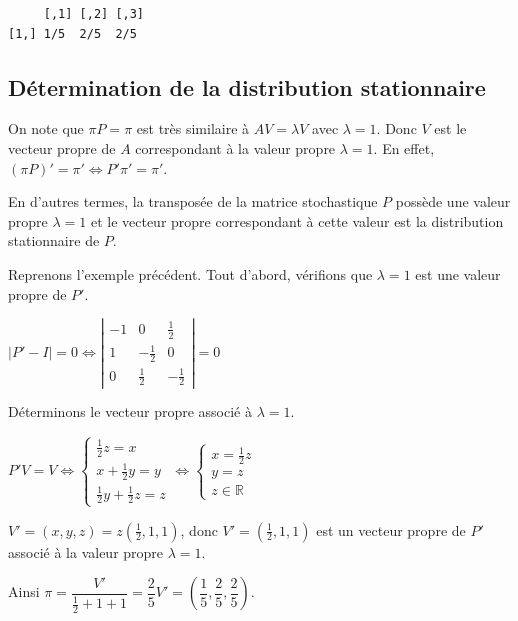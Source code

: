 \documentclass[
]{book}
\theoremstyle{definition}
\theoremstyle{definition}
\theoremstyle{definition}
\theoremstyle{remark}
\begin{document}
\begin{verbatim}
     [,1] [,2] [,3]
[1,] 1/5  2/5  2/5 
\end{verbatim}

\hypertarget{duxe9termination-de-la-distribution-stationnaire}{%
\subsection{Détermination de la distribution stationnaire}\label{duxe9termination-de-la-distribution-stationnaire}}

On note que \(\pi P=\pi\) est très similaire à \(AV=\lambda V\) avec \(\lambda=1\). Donc \(V\) est le vecteur propre de \(A\) correspondant à la valeur propre \(\lambda=1\). En effet, \(\left(\pi P\right)'=\pi' \Longleftrightarrow P'\pi'=\pi'\).

En d'autres termes, la transposée de la matrice stochastique \(P\) possède une valeur propre \(\lambda=1\) et le vecteur propre correspondant à cette valeur est la distribution stationnaire de \(P\).

Reprenons l'exemple précédent. Tout d'abord, vérifions que \(\lambda=1\) est une valeur propre de \(P'\).

\(\left|P'-I\right|=0 \Longleftrightarrow \left| \begin{array}{ccc} -1 & 0 & \frac{1}{2}\\ 1 & -\frac{1}{2} & 0\\ 0 & \frac{1}{2} & -\frac{1}{2} \end{array} \right|=0\)

Déterminons le vecteur propre associé à \(\lambda=1\).

\(P'V=V \Longleftrightarrow \left\{ \begin{array}{l} \frac{1}{2}z=x\\ x+\frac{1}{2}y=y\\ \frac{1}{2}y + \frac{1}{2}z =z \end{array} \right. \Longleftrightarrow \left\{ \begin{array}{l} x=\frac{1}{2}z\\ y=z\\ z \in \mathbb{R} \end{array} \right.\)

\(V'=(x,y,z)=z(\frac{1}{2},1,1)\), donc \(V'=(\frac{1}{2},1,1)\) est un vecteur propre de \(P'\) associé à la valeur propre \(\lambda=1\).

Ainsi \(\pi=\dfrac{V'}{\frac{1}{2}+1+1}=\dfrac{2}{5}V'=\left(\dfrac{1}{5},\dfrac{2}{5},\dfrac{2}{5}\right)\).
\end{document}
